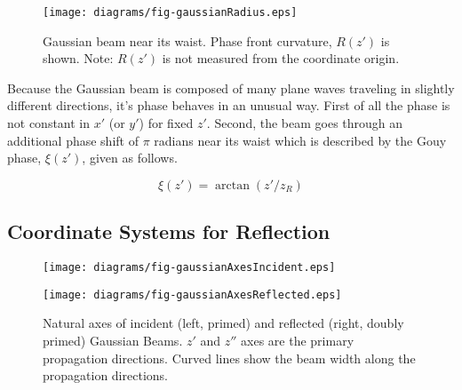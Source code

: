 \documentclass[12pt]{uthesis-v12}
\begin{document}
\begin{figure}[htb]
\centering
\texttt{[image: diagrams/fig-gaussianRadius.eps]}
\caption[Gaussian beam diagram showing phase front radius]{Gaussian beam near its waist. Phase front curvature, $R(z')$ is shown. Note: $R(z')$ is not measured from the coordinate origin.
 \label{fig-gaussianRadius}}
\end{figure}

Because the Gaussian beam is composed of many plane waves traveling in slightly different directions, it's phase behaves in an unusual way. First of all the phase is not constant in $x'$ (or $y'$) for fixed $z'$. Second, the beam goes through an additional phase shift of $\pi$ radians near its waist which is described by the Gouy phase, $\xi(z')$, given as follows.

\begin{equation}\label{eq-gouy}
\xi(z')=\arctan(z'/z_R)
\end{equation}



\subsection{Coordinate Systems for Reflection}

\begin{figure}[ht]
\centering
\begin{minipage}{.5\textwidth}
  \texttt{[image: diagrams/fig-gaussianAxesIncident.eps]}
\end{minipage}%
\begin{minipage}{.5\textwidth}
  \texttt{[image: diagrams/fig-gaussianAxesReflected.eps]}
\end{minipage}
\caption[Natural axes of incident and reflected Gaussian beams]{Natural axes of incident (left, primed) and reflected (right, doubly primed) Gaussian Beams. $z'$ and $z''$ axes are the primary propagation directions. Curved lines show the beam width along the propagation directions.
  \label{fig-gaussianAxes}}
\end{figure}
\end{document}
